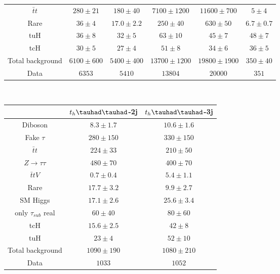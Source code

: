 \begin{table}[htbp]
\begin{tabular}{cccccc}
  $\bar{t}t$               & $280 \pm 21   $& $180 \pm 40   $& $7100 \pm 1200  $& $11600 \pm 700      $& $5 \pm 4      $ \\ 
  Rare                     & $36 \pm 4     $& $17.0 \pm 2.2 $& $250 \pm 40     $& $630 \pm 50         $& $6.7 \pm 0.7  $ \\ \midrule
  tuH                      & $36 \pm 8     $& $32 \pm 5     $& $63 \pm 10      $& $45 \pm 7           $& $48 \pm 7     $ \\ 
  tcH                      & $30 \pm 5     $& $27 \pm 4     $& $51 \pm 8       $& $34 \pm 6           $& $36 \pm 5     $ \\ \midrule
  Total background         & $6100 \pm 600 $& $5400 \pm 400 $& $13700 \pm 1200 $& $19800 \pm 1900     $& $350 \pm 40   $ \\ \midrule
  Data                     & $6353         $& $5410         $& $13804          $& $20000              $& $351          $ \\ 
\bottomrule\bottomrule
\end{tabular}\\

\begin{tabular}{ccc} \toprule\toprule
& $t_{h}\thadhad$-2j & $t_{h}\thadhad$-3j\\\midrule
  Diboson                  & $8.3 \pm 1.7  $& $10.6 \pm 1.6$\\ 
  Fake $\tau$              & $280 \pm 150  $& $330 \pm 150 $\\ 
  $\bar{t}t$                & $224 \pm 33   $& $210 \pm 50  $\\ 
  $Z\rightarrow\tau\tau$   & $480 \pm 70   $& $400 \pm 70  $\\ 
  $\bar{t}tV$              & $0.7 \pm 0.4  $& $5.4 \pm 1.1 $\\ 
  Rare                     & $17.7 \pm 3.2 $& $9.9 \pm 2.7 $\\ 
  SM Higgs                 & $17.1 \pm 2.6 $& $25.6 \pm 3.4$\\ 
  only $\tau_{sub}$ real   & $60 \pm 40    $& $80 \pm 60   $\\ \midrule
  tcH                      & $15.6 \pm 2.5 $& $42 \pm 8    $\\ 
  tuH                      & $23 \pm 4     $& $52 \pm 10   $ \\ \midrule
  Total background         & $1090 \pm 190 $& $1080 \pm 210$ \\ \midrule 
  Data                     & $1033$         & $1052$ \\ 
\bottomrule\bottomrule
\end{tabular}
\label{tab:HtautauPrefitYieldsUnblind}
\end{table} 






















